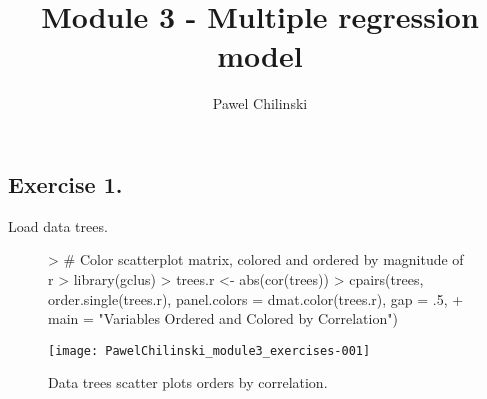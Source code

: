 \documentclass[a4paper]{article}
\title{Module 3 - Multiple regression model}
\author{Pawel Chilinski}
\begin{document}

\maketitle
\subsection{Exercise 1.} Load data trees.
\begin{figure}[H]
\begin{center}
\begin{Schunk}
\begin{Sinput}
> # Color scatterplot matrix, colored and ordered by magnitude of r
> library(gclus)
> trees.r <- abs(cor(trees))
> cpairs(trees, order.single(trees.r), panel.colors = dmat.color(trees.r), gap = .5,
+        main = "Variables Ordered and Colored by Correlation")
\end{Sinput}
\end{Schunk}
\texttt{[image: PawelChilinski\_module3\_exercises-001]}
\caption{Data trees scatter plots orders by correlation.}
\end{center}
\end{figure}
\end{document}
